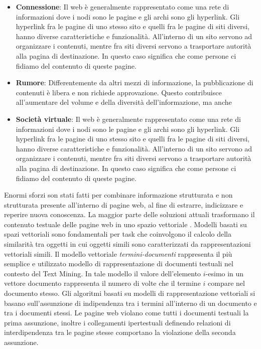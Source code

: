 \begin{itemize}
\item \textbf{Connessione}: Il web è generalmente rappresentato come una rete di informazioni dove i nodi sono le pagine e gli archi sono gli hyperlink. Gli hyperlink fra le pagine di uno stesso sito e quelli fra le pagine di siti diversi, hanno diverse caratteristiche e funzionalità. All'interno di un sito servono ad organizzare i contenuti, mentre fra siti diversi servono a trasportare autorità alla pagina di destinazione. In questo caso significa che come persone ci fidiamo del contenuto di queste pagine.

\item \textbf{Rumore}: 
Differentemente da altri mezzi di informazione, la pubblicazione di contenuti è libera e non richiede approvazione. Questo contribuisce all'aumentare del volume e della diversità dell'informazione, ma anche

\item \textbf{Società virtuale}: Il web è generalmente rappresentato come una rete di informazioni dove i nodi sono le pagine e gli archi sono gli hyperlink. Gli hyperlink fra le pagine di uno stesso sito e quelli fra le pagine di siti diversi, hanno diverse caratteristiche e funzionalità. All'interno di un sito servono ad organizzare i contenuti, mentre fra siti diversi servono a trasportare autorità alla pagina di destinazione. In questo caso significa che come persone ci fidiamo del contenuto di queste pagine.

\end{itemize}

Enormi sforzi son stati fatti per combinare informazione strutturata e non strutturata presente all'interno di pagine web, al fine di estrarre, indicizzare e reperire nuova conoscenza. 
La maggior parte delle soluzioni attuali trasformano il contenuto testuale delle pagine web in uno spazio vettoriale \cite{Turney10}. Modelli basati su spazi vettoriali sono fondamentali per task che coinvolgono il calcolo della similarità tra oggetti in cui oggetti simili sono caratterizzati da rappresentazioni vettoriali simili. Il modello vettoriale \textit{termini-documenti} rappresenta il più semplice e utilizzato modello di rappresentazione di documenti testuali nel contesto del Text Mining. In tale modello il valore dell'elemento $i$-esimo in un vettore documento rappresenta il numero di volte che il termine $i$ compare nel documento stesso.    
Gli algoritmi basati su modelli di rappresentazione vettoriali si basano sull'assunzione di indipendenza tra i termini all'interno di un documento e tra i documenti stessi. Le pagine web violano come tutti i documenti testuali la prima assunzione, inoltre i collegamenti ipertestuali definendo relazioni di interdipendenza tra le pagine stesse comportano la violazione della seconda assunzione.

